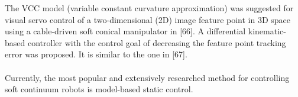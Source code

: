 \documentclass[12pt,twoside,a4]{mwbk}
\begin{document}
\noindent The VCC model (variable constant curvature approximation) was suggested for visual servo control of a two-dimensional (2D) image feature point in 3D space using a cable-driven soft conical manipulator in [66]. A differential kinematic-based controller with the control goal of decreasing the feature point tracking error was proposed. It is similar to the one in [67]. %
\\ \\ 
Currently, the most popular and extensively researched method for controlling soft continuum robots is model-based static control. 
\end{document}
